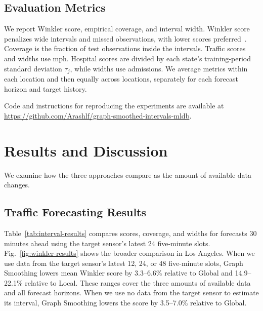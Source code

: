 \documentclass[conference]{IEEEtran}
\begin{document}
\subsection{Evaluation Metrics}

We report Winkler score, empirical coverage, and interval width. Winkler score penalizes wide intervals and missed observations, with lower scores preferred~\cite{winkler1972interval,bracher2021evaluating}. Coverage is the fraction of test observations inside the intervals. Traffic scores and widths use mph. Hospital scores are divided by each state's training-period standard deviation $\tau_j$, while widths use admissions. We average metrics within each location and then equally across locations, separately for each forecast horizon and target history.

Code and instructions for reproducing the experiments are available at \url{https://github.com/Arashlf/graph-smoothed-intervals-mldb}.

\section{Results and Discussion}
\label{sec:evaluation}

We examine how the three approaches compare as the amount of available data changes.

\subsection{Traffic Forecasting Results}

Table~\ref{tab:interval-results} compares scores, coverage, and widths for forecasts 30 minutes ahead using the target sensor's latest 24 five-minute slots. Fig.~\ref{fig:winkler-results} shows the broader comparison in Los Angeles. When we use data from the target sensor's latest 12, 24, or 48 five-minute slots, Graph Smoothing lowers mean Winkler score by 3.3--6.6\% relative to Global and 14.9--22.1\% relative to Local. These ranges cover the three amounts of available data and all forecast horizons. When we use no data from the target sensor to estimate its interval, Graph Smoothing lowers the score by 3.5--7.0\% relative to Global.
\end{document}
